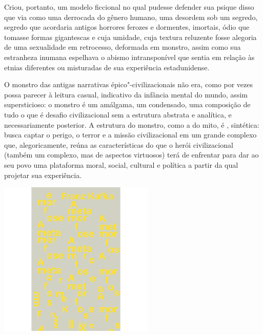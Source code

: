 \begin{multicols}{2}
Criou, portanto, um modelo ficcional no qual pudesse defender sua psique
disso que via como uma derrocada do gênero humano, uma desordem sob um
segredo, segredo que acordaria antigos horrores ferozes e dormentes,
imortais, ódio que tomasse formas gigantescas e cuja umidade, cuja
textura reluzente fosse alegoria de uma sexualidade em retrocesso,
deformada em monstro, assim como sua
estranheza inumana espelhava o abismo intransponível que sentia em
relação às etnias diferentes ou misturadas de sua experiência
estadunidense.

O monstro das antigas narrativas épico"-civilizacionais não era,
como por vezes possa parecer à leitura casual, indicativo da infância
mental do mundo, assim supersticioso: o monstro é um amálgama, um
condensado, uma composição de tudo o que é desafio civilizacional sem a
estrutura abstrata e analítica, e necessariamente posterior. A estrutura do
monstro, como a do mito, é {}, sintética: busca captar o
perigo, o terror e a missão civilizacional em um grande complexo que,
alegoricamente, reúna as características do que o herói civilizacional
(também um complexo, mas de aspectos virtuosos) terá de enfrentar para
dar ao seu povo uma plataforma moral, social, cultural e política a
partir da qual projetar sua experiência.

\bigskip

\noindent{}\textcolor{gray}{\footnotesize{}}
\end{multicols}


\pagebreak %

\begin{center}
\hspace*{.5cm}\includegraphics[width=74mm]{./grid/kafka.png}
\end{center}

